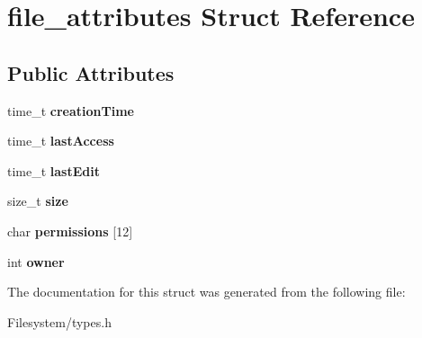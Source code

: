 \hypertarget{structfile__attributes}{}\section{file\+\_\+attributes Struct Reference}
\label{structfile__attributes}
\subsection*{Public Attributes}
\begin{DoxyCompactItemize}
\item 
\mbox{\label{structfile__attributes_a9fa92e6a7d6ac7f18df7940697524411}} 
time\+\_\+t {\bfseries creation\+Time}
\item 
\mbox{\label{structfile__attributes_a9b16144fd6ce8d982afc738058f07fa3}} 
time\+\_\+t {\bfseries last\+Access}
\item 
\mbox{\label{structfile__attributes_ad4592775c8cb9a899a12ca551329a936}} 
time\+\_\+t {\bfseries last\+Edit}
\item 
\mbox{\label{structfile__attributes_a753691702c194d2e43c0fb62e6cd4ee1}} 
size\+\_\+t {\bfseries size}
\item 
\mbox{\label{structfile__attributes_a6af710c43bfc31b1a005c9ad7251f801}} 
char {\bfseries permissions} \mbox{[}12\mbox{]}
\item 
\mbox{\label{structfile__attributes_a74be4a864fa3f38eff632b4b25654b97}} 
int {\bfseries owner}
\end{DoxyCompactItemize}


The documentation for this struct was generated from the following file\+:\begin{DoxyCompactItemize}
\item 
Filesystem/types.\+h\end{DoxyCompactItemize}
